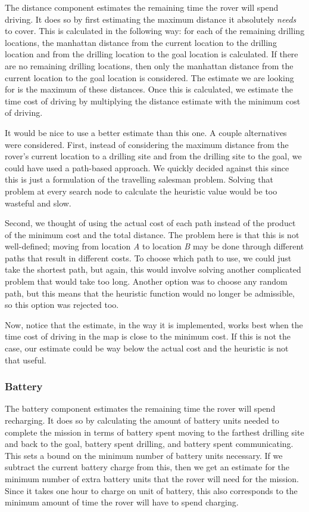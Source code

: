 		The distance component estimates the remaining time the rover will spend driving. It does so by first estimating
		the maximum distance it absolutely \emph{needs} to cover. This is calculated in the following way: for each of
		the remaining drilling locations, the manhattan distance from the current location to the drilling location
		and from the drilling location to the goal location is calculated. If there are no remaining drilling locations,
		then only the manhattan distance from the current location to the goal location is considered. The estimate we
		are looking for is the maximum of these distances. Once this is calculated, we estimate the time cost of
		driving by multiplying the distance estimate with the minimum cost of driving.
						
		It would be nice to use a better estimate than this one. A couple alternatives were considered. First, instead
		of considering the maximum distance from the rover's current location to a drilling site and from the drilling
		site to the goal, we could have used a path-based approach. We quickly decided against this since this is
		just a formulation of the travelling salesman problem. Solving that problem at every search node to calculate
		the heuristic value would be too wasteful and slow.
		
		Second, we thought of using the actual cost of each path instead of the product of the minimum cost and the
		total distance. The problem here is that this is not well-defined; moving from location \textit{A} to location
		\textit{B} may be done through different paths that result in different costs. To choose which path to use, we
		could just take the shortest path, but again, this would involve solving another complicated problem that
		would take too long. Another option was to choose any random path, but this means that the heuristic function
		would no longer be admissible, so this option was rejected too.
		
		Now, notice that the estimate, in the way it is implemented, works best when the time cost of driving in the
		map is close to the minimum cost. If this is not the case, our estimate could be way below the actual cost and
		the heuristic is not that useful.
		
		\subsubsection{Battery}
		
		The battery component estimates the remaining time the rover will spend recharging. It does so by calculating
		the amount of battery units needed to complete the mission in terms of battery spent moving to the farthest
		drilling site and back to the goal, battery spent drilling, and battery spent communicating. This sets a bound
		on the minimum number of battery units necessary. If we subtract the current battery charge from this, then we
		get an estimate for the minimum number of extra battery units that the rover will need for the mission. Since it
		takes	one hour to charge on unit of battery, this also corresponds to the minimum amount of time the rover will
		have to spend charging.
		
